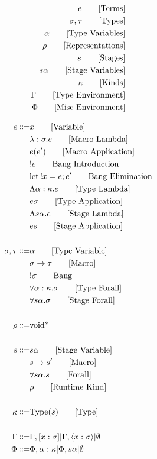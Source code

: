 \documentclass {article}
\begin{document}
\Large

\begin{align*}
e \tag* {[Terms]}\\
\sigma, \tau \tag* {[Types]} \\
\alpha \tag* {[Type Variables]} \\
\rho \tag* {[Representations]} \\
s \tag* {[Stages]} \\
s \alpha \tag* {[Stage Variables]} \\
\kappa \tag* {[Kinds]} \\
\Gamma \tag* {[Type Environment]} \\
\Phi \tag* {[Misc Environment]}
\end{align*}

\begin{align*}
e \Coloneqq & x \tag*{[Variable]}\\
& \lambda : \sigma. e \tag*{[Macro Lambda]}\\
& e(e') \tag*{[Macro Application]}\\
& !e \tag*{Bang Introduction} \\
& \text{let} \, !x = e; e' \tag*{Bang Elimination} \\ 
& \Lambda \alpha : \kappa. e \tag*{[Type Lambda]} \\
& e \sigma \tag*{[Type Application]} \\
& \Lambda s \alpha. e \tag*{[Stage Lambda]} \\
& e s \tag*{[Stage Application]} \\
\\
\sigma, \tau \Coloneqq & \alpha \tag* {[Type Variable]}\\
& \sigma \to \tau \tag*{[Macro]}\\
& !\sigma \tag*{Bang} \\
& \forall \alpha : \kappa. \sigma \tag*{[Type Forall]}\\ 
& \forall s \alpha. \sigma \tag*{[Stage Forall]}\\
\\
\rho \Coloneqq & \text{void*}\\
\\
s \Coloneqq & s \alpha \tag*{[Stage Variable]}\\
& s \to s' \tag*{[Macro]} \\
& \forall s \alpha. s \tag*{[Forall]}\\
& \rho \tag*{[Runtime Kind]}\\
\\
\kappa \Coloneqq & \text{Type} (s) \tag*{[Type]}\\
\\
\Gamma \Coloneqq & \Gamma, [x : \sigma] | \Gamma, \langle x : \sigma \rangle | \emptyset \\
\Phi \Coloneqq & \Phi, \alpha : \kappa | \Phi, s \alpha |  \emptyset \\
\end{align*}
\end{document}
